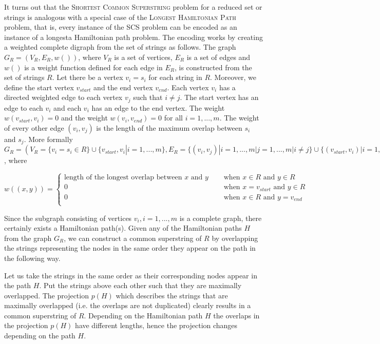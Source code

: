 \documentclass[english,twoside,censored,csm,algorithms-track-2020]{HYthesisML}
\theoremstyle{plain}
\theoremstyle{definition}
\begin{document}
It turns out that the \textsc{Shortest Common Superstring} problem for a reduced set or strings is
analogous with a special case of
the \textsc{Longest Hamiltonian Path} problem, that is, every instance of the SCS problem can be encoded
as an instance of a longesta Hamiltonian path problem. The encoding works by creating a weighted
complete digraph from the set of strings as follows. 
The graph $G_R=(V_R,E_R,w())$, where $V_R$ is a set of vertices, $E_R$ is a set of edges and $w()$ is a
 weight function defined for each edge in $E_R$, is constructed from the set of strings $R$.
Let there be a vertex $v_i=s_i$ for each string in $R$. Moreover, we define the start vertex
$v_{start}$ and the end vertex $v_{end}$. Each vertex $v_i$ has a directed weighted edge to each vertex
$v_j$ such that $i\neq j$. The start vertex has an edge to each $v_i$ and each $v_i$ has an edge to the
end vertex. The weight $w(v_{start}, v_i) = 0$ and the weight $w(v_i, v_{end}) = 0$ for all $i=1,...,m$.
The weight of every other edge $(v_i, v_j)$ is the length of the maximum overlap between $s_i$ and $s_j$.
More formally $G_R=(V_R=\{v_i=s_i\in R\}\cup\{v_{start},v_i | i=1,...,m\}, E_R=\{(v_i,v_j) | i=1,...,m | j=1,...,m | i\neq j\}\cup\{(v_{start},v_{i}) | i=1,...,m\}\cup\{(v_i,v_{end}) | i=1,...,m\},w)$, where

\[   
w((x,y)) = 
     \begin{cases}
       \text{length of the longest overlap between } x \text{ and } y &\quad\text{ when } x\in R \text{ and } y\in R  \\
       0 &\quad\text{ when } x=v_{start} \text{ and } y\in R \\
       0 &\quad\text{ when } x\in R \text{ and } y=v_{end} \\
     \end{cases}
\]


Since the subgraph consisting of vertices $v_i, i=1,...,m$ is a complete graph, there certainly exists a
Hamiltonian path(s).\citep{asd} Given any
of the Hamiltonian paths $H$ from the graph $G_R$, we can construct a common superstring of $R$ by
overlapping the strings representing the nodes in the same order they appear on the path in the
following way.

Let us take the strings in the same order as their corresponding nodes appear in the path $H$. Put the
strings above each other such that they are maximally overlapped. The projection $p(H)$ which describes
the strings that are maximally overlapped (i.e. the overlaps are not duplicated) clearly results in a
common superstring of $R$. Depending on the Hamiltonian path $H$ the overlaps in the
projection $p(H)$ have different lengths, hence the projection changes depending on the path $H$. 
\end{document}
